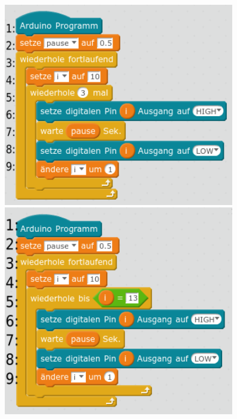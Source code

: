 \documentclass[ngerman, 11pt]{scrreprt}
\begin{document}
	\begin{figure}[H]
		\begin{minipage}{0.48\textwidth}
			\centering
			\includegraphics[width=0.9\textwidth]{../lsg/4-2-A1-Lauflicht-Lsg1-z.png}
		\end{minipage}
		\hfill
		\begin{minipage}{0.48\textwidth}
			\centering
			\includegraphics[width=0.9\textwidth]{../lsg/4-2-A1-Lauflicht-Lsg2-z.png}
		\end{minipage}
	\end{figure}
\end{document}
